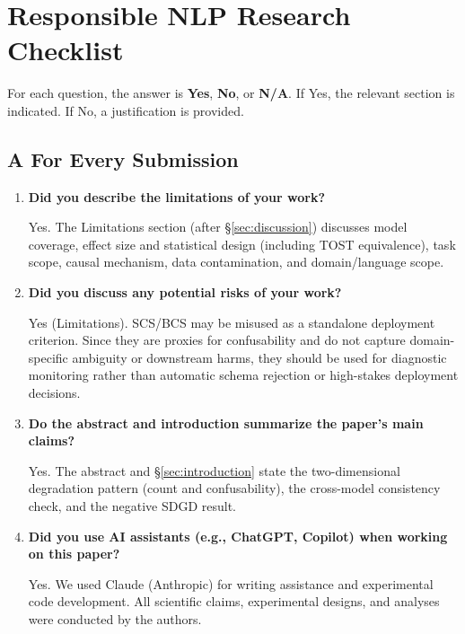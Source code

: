 \section*{Responsible NLP Research Checklist}

For each question, the answer is \textbf{Yes}, \textbf{No}, or \textbf{N/A}. If Yes, the relevant section is indicated. If No, a justification is provided.

\subsection*{A \quad For Every Submission}

\begin{enumerate}[label=\textbf{A\arabic*.},leftmargin=*,itemsep=4pt]

\item \textbf{Did you describe the limitations of your work?}

Yes. The Limitations section (after \S\ref{sec:discussion}) discusses model coverage, effect size and statistical design (including TOST equivalence), task scope, causal mechanism, data contamination, and domain/language scope.

\item \textbf{Did you discuss any potential risks of your work?}

Yes (Limitations). SCS/BCS may be misused as a standalone deployment criterion. Since they are proxies for confusability and do not capture domain-specific ambiguity or downstream harms, they should be used for diagnostic monitoring rather than automatic schema rejection or high-stakes deployment decisions.

\item \textbf{Do the abstract and introduction summarize the paper's main claims?}

Yes. The abstract and \S\ref{sec:introduction} state the two-dimensional degradation pattern (count and confusability), the cross-model consistency check, and the negative SDGD result.

\item \textbf{Did you use AI assistants (e.g., ChatGPT, Copilot) when working on this paper?}

Yes. We used Claude (Anthropic) for writing assistance and experimental code development. All scientific claims, experimental designs, and analyses were conducted by the authors.

\end{enumerate}

